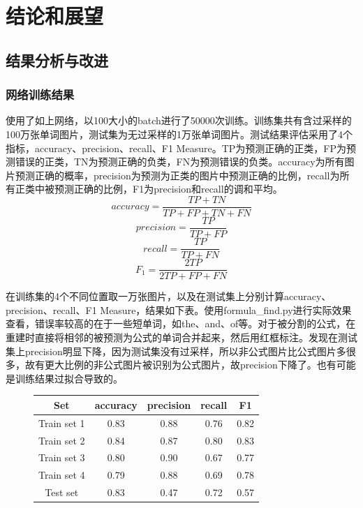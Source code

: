 
\chapter{结论和展望}

\section{结果分析与改进}

\subsection{网络训练结果}
\noindent

使用了如上网络，以100大小的batch进行了50000次训练。训练集共有含过采样的100万张单词图片，测试集为无过采样的1万张单词图片。测试结果评估采用了4个指标，accuracy、precision、recall、F1 Measure。TP为预测正确的正类，FP为预测错误的正类，TN为预测正确的负类，FN为预测错误的负类。accuracy为所有图片预测正确的概率，precision为预测为正类的图片中预测正确的比例，recall为所有正类中被预测正确的比例，F1为precision和recall的调和平均。
\[accuracy = \frac {TP + TN} {TP + FP + TN + FN}\]
\[precision = \frac {TP} {TP + FP}\]
\[recall = \frac {TP} {TP + FN}\]
\[F_1 = \frac {2 TP } {2 TP + FP + FN}\]



在训练集的4个不同位置取一万张图片，以及在测试集上分别计算accuracy、precision、recall、F1 Measure，结果如下表。使用formula\_find.py进行实际效果查看，错误率较高的在于一些短单词，如the、and、of等。对于被分割的公式，在重建时直接将相邻的被预测为公式的单词合并起来，然后用红框标注。发现在测试集上precision明显下降，因为测试集没有过采样，所以非公式图片比公式图片多很多，故有更大比例的非公式图片被识别为公式图片，故precision下降了。也有可能是训练结果过拟合导致的。

\begin{figure}[hp]
\centering
\begin{tabular}{ccccc}
\toprule
Set& accuracy& precision& recall& F1\\
\midrule
Train set 1& 0.83& 0.88& 0.76& 0.82\\
Train set 2& 0.84& 0.87& 0.80& 0.83\\
Train set 3& 0.80& 0.90& 0.67& 0.77\\
Train set 4& 0.79& 0.88& 0.69& 0.78\\
Test set& 0.83& 0.47& 0.72& 0.57\\
\bottomrule
\end{tabular}
\end{figure}

